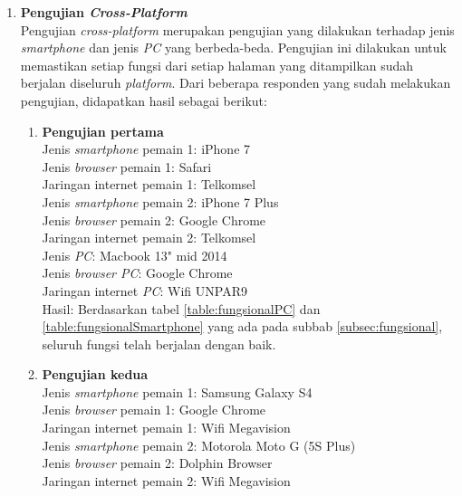 \begin{enumerate}
	\item \textbf{Pengujian \textit{Cross-Platform}} \\
	Pengujian \textit{cross-platform} merupakan pengujian yang dilakukan terhadap jenis \textit{smartphone} dan jenis \textit{PC} yang berbeda-beda. Pengujian ini dilakukan untuk memastikan setiap fungsi dari setiap halaman yang ditampilkan sudah berjalan diseluruh \textit{platform}. Dari beberapa responden yang sudah melakukan pengujian, didapatkan hasil sebagai berikut:
	
	\begin{enumerate}
		\item \textbf{Pengujian pertama} \\
		Jenis \textit{smartphone} pemain 1: iPhone 7 \\
		Jenis \textit{browser} pemain 1: Safari\\
		Jaringan internet pemain 1: Telkomsel\\
		
		Jenis \textit{smartphone} pemain 2: iPhone 7 Plus\\
		Jenis \textit{browser} pemain 2: Google Chrome\\
		Jaringan internet pemain 2: Telkomsel\\
		
		Jenis \textit{PC}: Macbook 13" mid 2014\\
		Jenis \textit{browser PC}: Google Chrome\\
		Jaringan internet \textit{PC}: Wifi UNPAR9\\
		
		Hasil: Berdasarkan tabel \ref{table:fungsionalPC} dan \ref{table:fungsionalSmartphone} yang ada pada subbab \ref{subsec:fungsional}, seluruh fungsi telah berjalan dengan baik.
		
		\item \textbf{Pengujian kedua} \\
		Jenis \textit{smartphone} pemain 1: Samsung Galaxy S4\\
		Jenis \textit{browser} pemain 1: Google Chrome\\
		Jaringan internet pemain 1: Wifi Megavision\\
		
		Jenis \textit{smartphone} pemain 2: Motorola Moto G (5S Plus)\\
		Jenis \textit{browser} pemain 2: Dolphin Browser\\
		Jaringan internet pemain 2: Wifi Megavision\\
		

\end{enumerate}
\end{enumerate}
